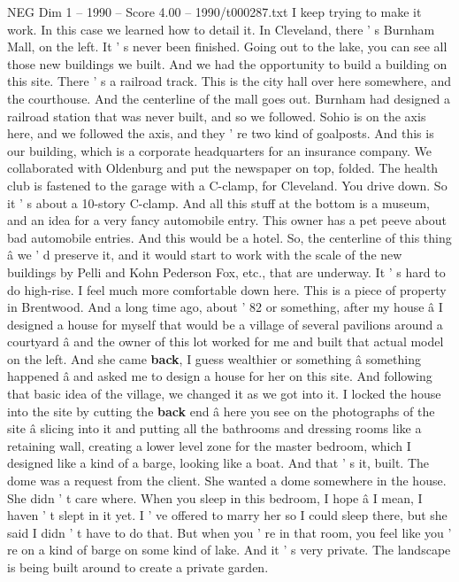 \begin{textsample}{NEG Dim 1 – 1990 – Score 4.00 – 1990/t000287.txt}
I keep trying to make it work.
In this case we learned how to detail it.
In Cleveland, there ' s Burnham Mall, on the left.
It ' s never been finished.
Going out to the lake, you can see all those new buildings we built.
And we had the opportunity to build a building on this site.
There ' s a railroad track.
This is the city hall over here somewhere, and the courthouse.
And the centerline of the mall goes out.
Burnham had designed a railroad station that was never built, and so we followed.
Sohio is on the axis here, and we followed the axis, and they ' re two kind of goalposts.
And this is our building, which is a corporate headquarters for an insurance company.
We collaborated with Oldenburg and put the newspaper on top, folded.
The health club is fastened to the garage with a C-clamp, for Cleveland.
You drive down.
So it ' s about a 10-story C-clamp.
And all this stuff at the bottom is a museum, and an idea for a very fancy automobile entry.
This owner has a pet peeve about bad automobile entries.
And this would be a hotel.
So, the centerline of this thing â we ' d preserve it, and it would start to work with the scale of the new buildings by Pelli and Kohn Pederson Fox, etc., that are underway.
It ' s hard to do high-rise.
I feel much more comfortable down here.
This is a piece of property in Brentwood.
And a long time ago, about ' 82 or something, after my house â I designed a house for myself that would be a village of several pavilions around a courtyard â and the owner of this lot worked for me and built that actual model on the left.
And she came \textbf{back}, I guess wealthier or something â something happened â and asked me to design a house for her on this site.
And following that basic idea of the village, we changed it as we got into it.
I locked the house into the site by cutting the \textbf{back} end â here you see on the photographs of the site â slicing into it and putting all the bathrooms and dressing rooms like a retaining wall, creating a lower level zone for the master bedroom, which I designed like a kind of a barge, looking like a boat.
And that ' s it, built.
The dome was a request from the client.
She wanted a dome somewhere in the house.
She didn ' t care where.
When you sleep in this bedroom, I hope â I mean, I haven ' t slept in it yet.
I ' ve offered to marry her so I could sleep there, but she said I didn ' t have to do that.
But when you ' re in that room, you feel like you ' re on a kind of barge on some kind of lake.
And it ' s very private.
The landscape is being built around to create a private garden.

\end{textsample}
